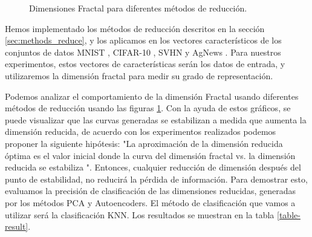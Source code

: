 \begin{figure}[htbp]
\caption{Dimensiones Fractal para diferentes métodos de reducción.} \label{fig:datasetscap5}
\end{figure}


Hemos implementado los métodos de reducción descritos en la sección \ref{sec:methods_reduce}, y los aplicamos en los vectores característicos de los conjuntos de datos MNIST \cite{lecun-mnisthandwrittendigit-2010}, CIFAR-10 \cite{cifar10}, SVHN \cite{svhn} y AgNews \cite{DelCorso:2005:RSN:1060745.1060764}. Para nuestros experimentos, estos vectores de características serán los datos de entrada, y utilizaremos la dimensión fractal para medir su grado de representación.

Podemos analizar el comportamiento de la dimensión Fractal usando diferentes métodos de reducción usando las figuras \ref{fig:datasetscap5}. Con la ayuda de estos gráficos, se puede visualizar  que las curvas generadas se estabilizan a medida que aumenta la dimensión reducida, de acuerdo con los experimentos realizados podemos proponer la siguiente hipótesis: "La aproximación de la dimensión reducida óptima es el valor inicial donde la curva del dimensión fractal vs. la dimensión reducida se estabiliza ". Entonces, cualquier reducción de dimensión después del punto de estabilidad, no reducirá la pérdida de información. Para demostrar esto, evaluamos la precisión de clasificación de las dimensiones reducidas, generadas por los métodos PCA y Autoencoders. El método de clasificación que vamos a utilizar será la clasificación KNN. Los resultados se muestran en la tabla \ref{table-result}.

